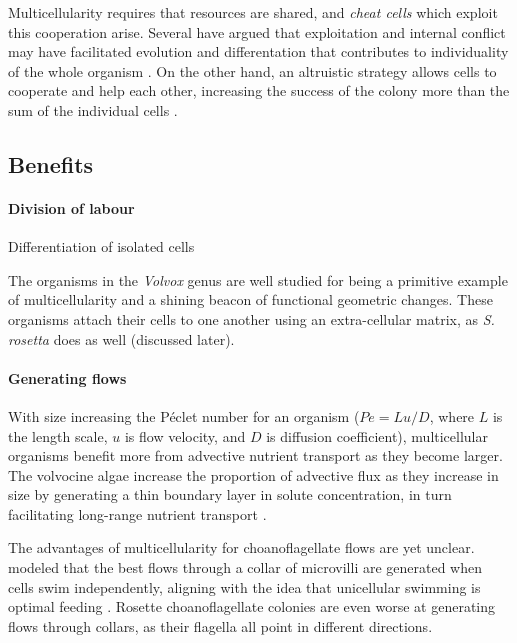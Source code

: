 Multicellularity requires that resources are shared, and \textit{cheat cells} which exploit this cooperation arise.
Several have argued that exploitation and internal conflict may have facilitated evolution and differentation that contributes to individuality of the whole organism \citep{michod2001,rainey2010,hammerschmidt2014,grosberg2007}.
On the other hand, an altruistic strategy allows cells to cooperate and help each other, increasing the success of the colony more than the sum of the individual cells \citep{michod2006,gulli2019}.


\subsection{Benefits}

\paragraph*{Division of labour} Differentiation of isolated cells 

The organisms in the \textit{Volvox} genus are well studied for being a primitive example of multicellularity and a shining beacon of functional geometric changes. 
These organisms attach their cells to one another using an extra-cellular matrix, as \textit{S. rosetta} does as well (discussed later). 



\paragraph*{Generating flows} With size increasing the P\'eclet number for an organism ($Pe = Lu/D$, where $L$ is the length scale, $u$ is flow velocity, and $D$ is diffusion coefficient), multicellular organisms benefit more from advective nutrient transport as they become larger. 
The volvocine algae increase the proportion of advective flux as they increase in size by generating a thin boundary layer in solute concentration, in turn facilitating long-range nutrient transport \citep{short2006}.

The advantages of multicellularity for choanoflagellate flows are yet unclear. 
\citet{kirkegaard2016} modeled that the best flows through a collar of microvilli are generated when cells swim independently, aligning with the idea that unicellular swimming is optimal feeding \citep{michelin2011}. 
Rosette choanoflagellate colonies are even worse at generating flows through collars, as their flagella all point in different directions. 

